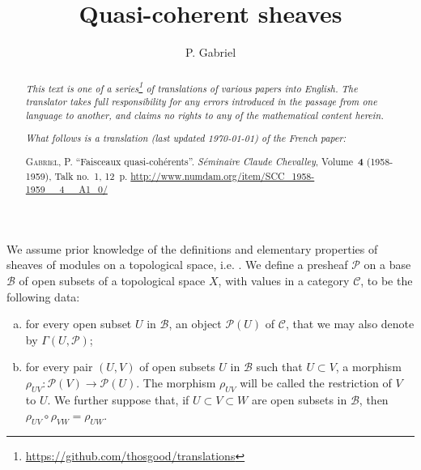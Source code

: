 \documentclass{article}
\title{Quasi-coherent sheaves}
\author{P. Gabriel}
\date{}
\theoremstyle{plain}
\theoremstyle{definition}
\newcommand{\sh}{\mathscr}
\newcommand{\cat}{\mathcal}
\newcommand{\oldpage}[1]{\marginpar{\footnotesize$\Big\vert$ \textit{p.~#1}}}
\begin{document}
\maketitle
\thispagestyle{fancy}

\renewcommand{\abstractname}{Translator's note.}

\begin{abstract}
  \renewcommand*{\thefootnote}{\fnsymbol{footnote}}
  \emph{This text is one of a series\footnote{\url{https://github.com/thosgood/translations}} of translations of various papers into English.}
  \emph{The translator takes full responsibility for any errors introduced in the passage from one language to another, and claims no rights to any of the mathematical content herein.}
  
  \emph{What follows is a translation (last updated \today) of the French paper:}

  \medskip\noindent
  \textsc{Gabriel, P.}
  ``Faisceaux quasi-coh\'{e}rents''.
  \emph{S\'{e}minaire Claude Chevalley}, Volume~\textbf{4} (1958-1959), Talk no.~1, 12~p.
  {\footnotesize\url{http://www.numdam.org/item/SCC_1958-1959__4__A1_0/}}
\end{abstract}

\setcounter{footnote}{0}

\tableofcontents
\bigskip



\oldpage{1-01}
We assume prior knowledge of the definitions and elementary properties of sheaves of modules on a topological space, i.e. \cite[chapitre~I, \S1; chapitre~II, \S\S1--2]{2}.
We define a presheaf $\sh{P}$ on a base $\mathscr{B}$ of open subsets of a topological space $X$, with values in a category $\cat{C}$, to be the following data:
\begin{enumerate}[(a)]
  \item for every open subset $U$ in $\mathscr{B}$, an object $\sh{P}(U)$ of $\cat{C}$, that we may also denote by $\Gamma(U,\sh{P})$;
  \item for every pair $(U,V)$ of open subsets $U$ in $\mathscr{B}$ such that $U\subset V$, a morphism $\rho_{UV}\colon\sh{P}(V)\to\sh{P}(U)$.
    The morphism $\rho_{UV}$ will be called the restriction of $V$ to $U$.
    We further suppose that, if $U\subset V\subset W$ are open subsets in $\mathscr{B}$, then $\rho_{UV}\circ\rho_{VW}=\rho_{UW}$.
\end{enumerate}
\end{document}
